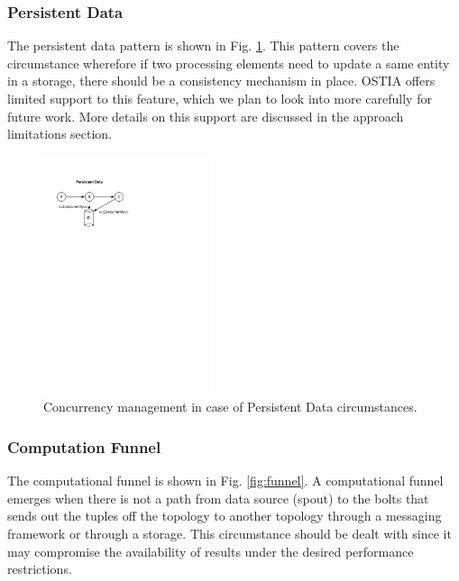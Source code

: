 
\subsubsection{Persistent Data}

The persistent data pattern is shown in Fig. \ref{fig:persistence}. This pattern covers the circumstance wherefore if two processing elements need to update a same entity in a storage, there should be a consistency mechanism in place. OSTIA offers limited support to this feature, which we plan to look into more carefully for future work. More details on this support are discussed in the approach limitations section.

\begin{figure}
	\begin{center}
		\includegraphics[width=5cm,draft]{images/fig4}
		\caption{Concurrency management in case of Persistent Data circumstances.}
		\label{fig:persistence}
	\end{center}
\end{figure}


\subsubsection{Computation Funnel}
The computational funnel is shown in Fig. \ref{fig:funnel}. A computational funnel emerges when there is not a path from data source (spout) to the bolts that sends out the tuples off the topology to another topology through a messaging framework or through a storage. This circumstance should be dealt with since it may compromise the availability of results under the desired performance restrictions.

